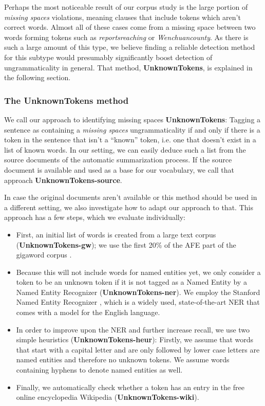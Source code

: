 \documentclass[a4paper,10pt]{scrartcl}
\theoremstyle{style}
\begin{document}
Perhaps the most noticeable result of our corpus study is the large portion of \textit{missing spaces} violations, meaning clauses that include tokens which aren't correct words. Almost all of these cases come from a missing space between two words forming tokens such as \textit{reportsreaching} or \textit{Wenchuancounty}. As there is such a large amount of this type, we believe finding a reliable detection method for this subtype would presumably significantly boost detection of ungrammaticality in general. That method, \textbf{UnknownTokens}, is explained in the following section.

\subsubsection{The UnknownTokens method}
We call our approach to identifying missing spaces \textbf{UnknownTokens}: Tagging a sentence as containing a \textit{missing spaces} ungrammaticality if and only if there is a token in the sentence that isn't a ``known'' token, i.e. one that doesn't exist in a list of known words. In our setting, we can easily deduce such a list from the source documents of the automatic summarization process. If the source document is available and used as a base for our vocabulary, we call that approach \textbf{UnknownTokens-source}.

In case the original documents aren't available or this method should be used in a different setting, we also investigate how to adapt our approach to that. This approach has a few steps, which we evaluate individually:

\begin{itemize}
\item First, an initial list of words is created from a large text corpus (\textbf{UnknownTokens-gw}); we use the first 20\% of the AFE part of the gigaword corpus \citep{gigaword}.

\item Because this will not include words for named entities yet, we only consider a token to be an unknown token if it is not tagged as a Named Entity by a Named Entity Recognizer (\textbf{UnknownTokens-ner}). We employ the Stanford Named Entity Recognizer \citep{stanfordNER}, which is a widely used, state-of-the-art NER that comes with a model for the English language.

\item In order to improve upon the NER and further increase recall, we use two simple heuristics (\textbf{UnknownTokens-heur}): Firstly, we assume that words that start with a capital letter and are only followed by lower case letters are named entities and therefore no unknown tokens. We assume words containing hyphens to denote named entities as well. 

\item Finally, we automatically check whether a token has an entry in the free online encyclopedia Wikipedia (\textbf{UnknownTokens-wiki}).

\end{itemize}
\end{document}
